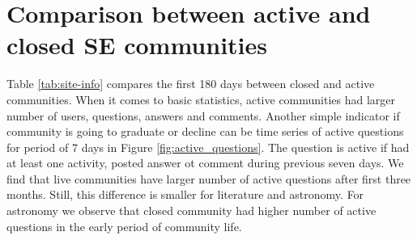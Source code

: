 

\section{Comparison between active and closed SE communities}

Table \ref{tab:site-info} compares the first 180 days between closed and active communities. When it comes to basic statistics, active communities had larger number of users, questions, answers and comments. Another simple indicator if community is going to graduate or decline can be time series of active questions for period of 7 days in Figure \ref{fig:active_questions}. The question is active if had at least one activity, posted answer ot comment during previous seven days. We find that live communities have larger number of active questions after first three months. Still, this difference is smaller for literature and astronomy. For astronomy we observe that closed community had higher number of active questions in the early period of community life. \\~\\


